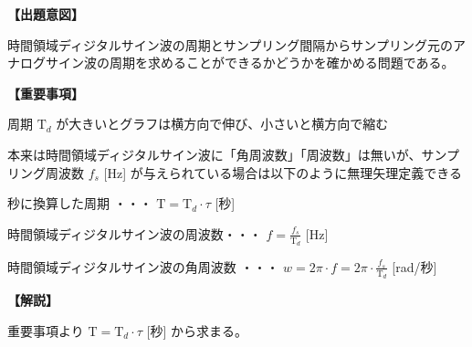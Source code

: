 \noindent \textbf{【出題意図】}

\bigskip
\noindent 時間領域ディジタルサイン波の周期とサンプリング間隔からサンプリング元のアナログサイン波の周期を求めることができるかどうかを確かめる問題である。

\vspace{1em}
\noindent \textbf{【重要事項】}

\bigskip
\noindent 周期 $\textrm{T}_d$ が大きいとグラフは横方向で伸び、小さいと横方向で縮む

\bigskip
\noindent 本来は時間領域ディジタルサイン波に「角周波数」「周波数」は無いが、サンプリング周波数 $f_s$ [Hz] が与えられている場合は以下のように無理矢理定義できる

\bigskip
\noindent 秒に換算した周期 ・・・ $\textrm{T} = \textrm{T}_d \cdot \tau$ [秒]

\bigskip
\noindent 時間領域ディジタルサイン波の周波数・・・ $f = \frac{f_s}{\textrm{T}_d}$ [Hz]

\bigskip
\noindent 時間領域ディジタルサイン波の角周波数 ・・・ $w = 2\pi \cdot f = 2 \pi \cdot \frac{f_s}{\textrm{T}_d}$ [rad/秒]

\bigskip

\vspace{1em}
\noindent \textbf{【解説】}

\bigskip
\noindent 重要事項より $\textrm{T} = \textrm{T}_d \cdot \tau$ [秒] から求まる。

